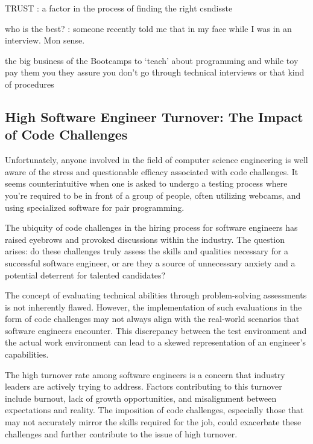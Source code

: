 \documentclass[
    a4paper, %
    10pt, %
    unnumberedsections, %
    twoside, %
]{LTJournalArticle}
\begin{document}
TRUST : a factor in the process of finding the right csndisste 

who is the best? : someone recently told me that in my face while I was in an interview. Mon sense. 


the big business of the Bootcamps to ‘teach’ about programming and while toy pay them you they assure you don't go through technical interviews or that kind of procedures 








\subsection{High Software Engineer Turnover: The Impact of Code Challenges}

Unfortunately, anyone involved in the field of computer science engineering is well aware of the stress and questionable efficacy associated with code challenges. It seems counterintuitive when one is asked to undergo a testing process where you're required to be in front of a group of people, often utilizing webcams, and using specialized software for pair programming.

The ubiquity of code challenges in the hiring process for software engineers has raised eyebrows and provoked discussions within the industry. The question arises: do these challenges truly assess the skills and qualities necessary for a successful software engineer, or are they a source of unnecessary anxiety and a potential deterrent for talented candidates?

The concept of evaluating technical abilities through problem-solving assessments is not inherently flawed. However, the implementation of such evaluations in the form of code challenges may not always align with the real-world scenarios that software engineers encounter. This discrepancy between the test environment and the actual work environment can lead to a skewed representation of an engineer's capabilities.

The high turnover rate among software engineers is a concern that industry leaders are actively trying to address. Factors contributing to this turnover include burnout, lack of growth opportunities, and misalignment between expectations and reality. The imposition of code challenges, especially those that may not accurately mirror the skills required for the job, could exacerbate these challenges and further contribute to the issue of high turnover.
\end{document}
